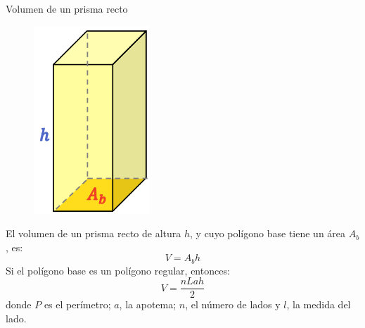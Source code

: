 
\begin{infocard}{Volumen de un prisma recto}
    \begin{figure}
        \centering
            \includegraphics[width=\linewidth]{../images/20230319192423}
        \end{figure}
    El volumen de un prisma recto de altura $h$, y cuyo polígono base tiene un área $A_b$, es:
    \[  V = A_b h\]
    Si el polígono base es un polígono regular, entonces:
    \[   V  = \dfrac{nLah}{2}\]
    donde $P$ es el perímetro; $a$, la apotema; $n$, el número de
    lados y $l$, la medida del lado.
\end{infocard}



